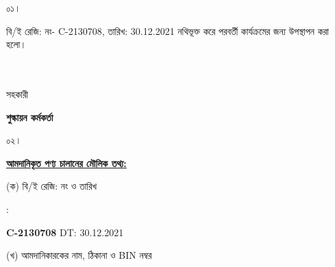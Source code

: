 \documentclass[12pt]{article}
\newcommand{\beno}{C-2130708}
\newcommand{\bedt}{30.12.2021}
\begin{document}
\noindent
\begin{minipage}[t]{0.05\linewidth}
০১।
\end{minipage}
\begin{minipage}[t]{0.95\linewidth}
বি/ই রেজি: নং- {\beno}, তারিখ: {\bedt}
নথিভূক্ত করে
পরবর্তী কার্যক্রমের জন্য উপস্থাপন করা হলো।
\\
\\
\\
\end{minipage}
\begin{minipage}[t]{0.05\linewidth}
\hspace*{0em}
\end{minipage}
\begin{minipage}[t]{0.05\linewidth}
সহকারী
\end{minipage}
\begin{minipage}[t]{0.37\linewidth}
\hspace{0em}
\end{minipage}
\begin{minipage}[t]{0.53\linewidth}
\textbf{শুল্কায়ন কর্মকর্তা}
\\
\end{minipage}
\begin{minipage}[t]{0.05\linewidth}
০২।
\end{minipage}
\begin{minipage}[t]{0.95\linewidth}
\underline{\textbf {আমদানিকৃত পণ্য চালানের
মৌলিক তথ্য:}}
\\
\end{minipage}
\footnotesize
\begin{minipage}[t]{0.05\linewidth}
\hspace*{1em}
\end{minipage}
\begin{minipage}[t]{0.40\linewidth}
(ক) বি/ই রেজি: নং ও তারিখ
\end{minipage}
\begin{minipage}[t]{0.02\linewidth}
:
\end{minipage}
\begin{minipage}[t]{0.53\linewidth}
\textbf{{\beno}} \hspace{2em} DT: {\bedt}
\\
\end{minipage}
\begin{minipage}[t]{0.05\linewidth}
\hspace*{1em}
\end{minipage}
\begin{minipage}[t]{0.40\linewidth}
(খ) আমদানিকারকের নাম, ঠিকানা
ও BIN নম্বর
\end{minipage}
\end{document}
